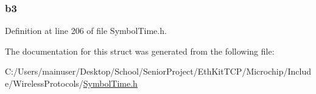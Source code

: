 \subsubsection[{b3}]{ b3}\label{struct___m_i_w_i___t_i_c_k_1_1___m_i_w_i___t_i_c_k__bytes_afa8f428b9dee4c9b8c3f2fc1fcc5b329}


Definition at line 206 of file Symbol\+Time.\+h.



The documentation for this struct was generated from the following file\+:\begin{DoxyCompactItemize}
\item 
C\+:/\+Users/mainuser/\+Desktop/\+School/\+Senior\+Project/\+Eth\+Kit\+T\+C\+P/\+Microchip/\+Include/\+Wireless\+Protocols/\hyperlink{_symbol_time_8h}{Symbol\+Time.\+h}\end{DoxyCompactItemize}
